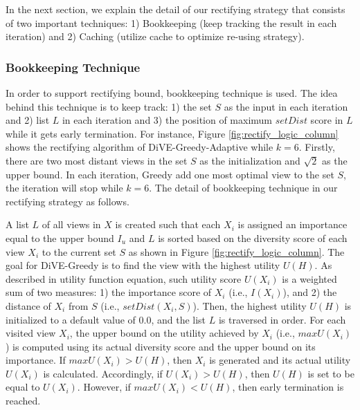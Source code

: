\documentclass{article}
\begin{document}
In the next section, we explain the detail of our rectifying strategy that consists of two important techniques: 1) Bookkeeping (keep tracking the result in each iteration) and 2) Caching (utilize cache to optimize re-using strategy).

\subsubsection{Bookkeeping Technique}
In order to support rectifying bound, bookkeeping technique is used. The idea behind this technique is to keep track: 1) the set $S$ as the input in each iteration and 2) list $L$ in each iteration and 3) the position of maximum $setDist$ score in $L$ while it gets early termination. For instance, Figure \ref{fig:rectify_logic_column} shows the rectifying algorithm of DiVE-Greedy-Adaptive while $k = 6$. Firstly, there are two most distant views in the set $S$ as the initialization and $\sqrt{2}$ as the upper bound. In each iteration, Greedy add one most optimal view to the set $S$, the iteration will stop while $k = 6$. The detail of bookkeeping technique in our rectifying strategy as follows.

A list $L$ of all views in $X$ is created such that each $X_i$ is assigned an importance equal to the upper bound $I_u$ and $L$ is sorted based on the diversity score of each view $X_i$ to the current set $S$ as shown in Figure \ref{fig:rectify_logic_column}.
The goal for DiVE-Greedy is to find the view with the highest utility $U(H)$. As described in %
utility function equation, such utility score $U(X_i)$ is a weighted sum of two measures: 1) the importance score of $X_i$ (i.e., $I(X_i)$), and 2) the distance of $X_i$ from $S$ (i.e., $ setDist\left(X_i, S\right)$). Then, the highest utility $U(H)$ is initialized to a default value of 0.0, and the list $L$ is traversed in order. 
%
For each visited view $X_i$, the upper bound on the utility achieved by $X_i$ (i.e., $maxU(X_i)$) is computed using its actual diversity score and the upper bound on its importance.
%
If $maxU(X_i) > U(H)$, then $X_i$ is generated and its actual utility $U(X_i)$ is calculated. 
%
Accordingly, if $U(X_i) > U(H)$, then $U(H)$ is set to be equal to $U(X_i)$. 
%
However, if $maxU(X_i) < U(H)$, then early termination is reached. 
\end{document}
